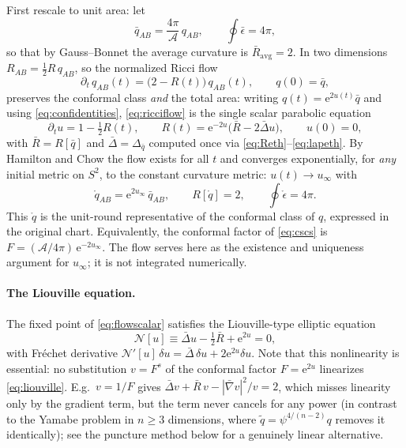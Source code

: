 \documentclass[11pt]{article}
\newcommand{\ee}{\mathrm{e}}
\newcommand{\qo}{\mathring{q}}          %
\newcommand{\epso}{\mathring{\epsilon}} %
\begin{document}
First rescale to unit area: let
\begin{equation}
  \bar q_{AB} = \frac{4\pi}{\mathcal{A}}\, q_{AB},
  \qquad \oint \bar\epsilon = 4\pi,
\end{equation}
so that by Gauss--Bonnet the average curvature is
$\bar R_{\mathrm{avg}} = 2$.  In two dimensions $R_{AB} = \tfrac12 R\,
q_{AB}$, so the normalized Ricci flow
\begin{equation}
  \partial_t\, q_{AB}(t) = \bigl(2 - R(t)\bigr)\, q_{AB}(t),
  \qquad q(0) = \bar q,
  \label{eq:ricciflow}
\end{equation}
preserves the conformal class \emph{and} the total area: writing
$q(t) = \ee^{2u(t)}\bar q$ and using \eqref{eq:confidentities},
\eqref{eq:ricciflow} is the single scalar parabolic equation
\begin{equation}
  \boxed{\;
  \partial_t u = 1 - \tfrac12 R(t),
  \qquad
  R(t) = \ee^{-2u}\bigl(\bar R - 2\bar\Delta u\bigr),
  \qquad u(0)=0,
  \;}
  \label{eq:flowscalar}
\end{equation}
with $\bar R = R[\bar q]$ and $\bar\Delta = \Delta_{\bar q}$ computed once via
\eqref{eq:Reth}--\eqref{eq:lapeth}.  By Hamilton and Chow
\cite{hamilton1988,chow1991} the flow exists for all $t$ and converges
exponentially, for \emph{any} initial metric on $S^2$, to the constant
curvature metric: $u(t)\to u_\infty$ with
\begin{equation}
  \qo_{AB} = \ee^{2u_\infty}\,\bar q_{AB},
  \qquad R[\qo] = 2,\qquad \oint\epso = 4\pi .
\end{equation}
This $\qo$ is the unit-round representative of the conformal class of $q$,
expressed in the original chart.  Equivalently, the conformal factor of
\eqref{eq:cscs} is $F = (\mathcal{A}/4\pi)\,\ee^{-2u_\infty}$.
The flow serves here as the existence and uniqueness argument for
$u_\infty$; it is not integrated numerically.

\paragraph{The Liouville equation.}
The fixed point of \eqref{eq:flowscalar} satisfies the Liouville-type
elliptic equation
\begin{equation}
  \mathcal{N}[u] \equiv \bar\Delta u - \tfrac12\bar R + \ee^{2u} = 0 ,
  \label{eq:liouville}
\end{equation}
with Fr\'echet derivative
$\mathcal{N}'[u]\,\delta u = \bar\Delta\,\delta u + 2\ee^{2u}\delta u$.
Note that this nonlinearity is essential: no substitution $v = F^s$ of the
conformal factor $F = \ee^{2u}$ linearizes \eqref{eq:liouville}.  E.g.\
$v = 1/F$ gives $\bar\Delta v + \bar R\,v - |\bar\nabla v|^2/v = 2$, which
misses linearity only by the gradient term, but the term never cancels for
any power (in contrast to the Yamabe problem in $n\ge3$ dimensions, where
$\tilde q = \psi^{4/(n-2)}q$ removes it identically); see
the puncture method below for a genuinely linear alternative.
\end{document}
